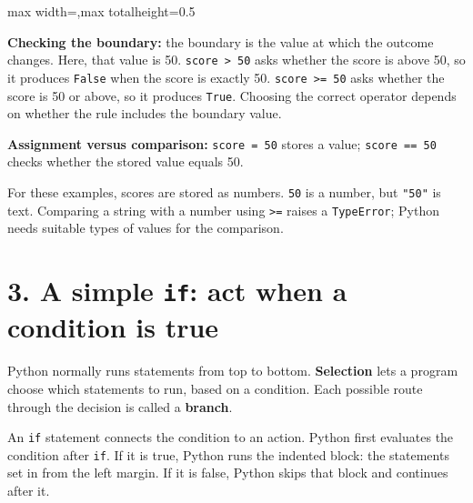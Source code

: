 \documentclass[12pt,a4paper]{article}
\begin{document}
\begin{center}
\begin{adjustbox}{max width=\linewidth,max totalheight=0.5\textheight}
\end{adjustbox}
\end{center}
\textbf{Checking the boundary:} the boundary is the value at which the outcome changes. Here, that value is 50. \texttt{score > 50} asks whether the score is above 50, so it produces \texttt{False} when the score is exactly 50. \texttt{score >= 50} asks whether the score is 50 or above, so it produces \texttt{True}. Choosing the correct operator depends on whether the rule includes the boundary value.

\textbf{Assignment versus comparison:} \texttt{score = 50} stores a value; \texttt{score == 50} checks whether the stored value equals 50.

For these examples, scores are stored as numbers. \texttt{50} is a number, but \texttt{"50"} is text. Comparing a string with a number using \texttt{>=} raises a \texttt{TypeError}; Python needs suitable types of values for the comparison.

\section*{3. A simple \texttt{if}: act when a condition is true}
Python normally runs statements from top to bottom. \textbf{Selection} lets a program choose which statements to run, based on a condition. Each possible route through the decision is called a \textbf{branch}.

An \texttt{if} statement connects the condition to an action. Python first evaluates the condition after \texttt{if}. If it is true, Python runs the indented block: the statements set in from the left margin. If it is false, Python skips that block and continues after it.
\end{document}
